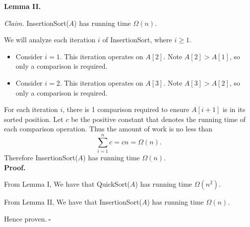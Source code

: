 \begin{enumerate}
\begin{solution}
\textbf{Lemma II.}

\textit{Claim. }{\sc InsertionSort}($A$) has running time $\Omega(n)$.

We will analyze each iteration $i$ of {\sc InsertionSort}, where $i\geq 1$.

\begin{itemize}
\item Consider $i=1$. This iteration operates on $A[2]$. Note $A[2]>A[1]$, so only a comparison is required.
\item Consider $i=2$. This iteration operates on $A[3]$. Note $A[3]>A[2]$, so only a comparison is required.
\end{itemize}
For each iteration $i$, there is 1 comparison required to ensure $A[i+1]$ is in its sorted position. Let $c$ be the positive constant that denotes the running time of each comparison operation. Thus the amount of work is no less than
\begin{equation*}
\sum_{i=1}^n{c}=cn=\Omega(n).
\end{equation*}
Therefore {\sc InsertionSort}($A$) has running time $\Omega(n)$.\\

\textbf{Proof. }

From Lemma I, We have that {\sc QuickSort}($A$) has running time $\Omega(n^2)$.

From Lemma II, We have that {\sc InsertionSort}($A$) has running time $\Omega(n)$.

Hence proven.$~\square$
\end{solution}
\end{enumerate}
\newpage
